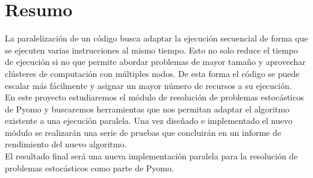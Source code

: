 \pagestyle{plain}
\chapter*{Resumo}

La paralelización de un código busca adaptar la ejecución secuencial de forma que se ejecuten varias instrucciones al mismo tiempo. Esto no solo reduce el tiempo de ejecución si no que permite abordar problemas de mayor tamaño y aprovechar clústeres de computación con múltiples nodos. De esta forma el código se puede escalar más fácilmente y asignar un mayor número de recursos a su ejecución.\\

En este proyecto estudiaremos el módulo de resolución de problemas estocásticos de Pyomo y buscaremos herramientas que nos permitan adaptar el algoritmo existente a una ejecución paralela. Una vez diseñado e implementado el nuevo módulo se realizarán una serie de pruebas que concluirán en un informe de rendimiento del nuevo algoritmo.\\

El resultado final será una nueva implementación paralela para la resolución de problemas estocásticos como parte de Pyomo.
